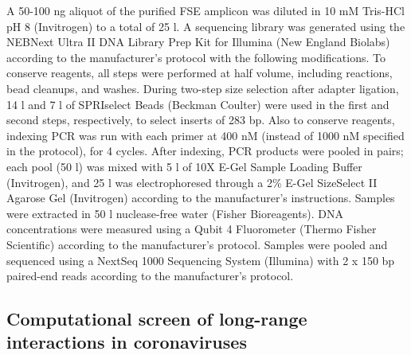 \documentclass[main.tex]{subfiles}
\begin{document}
A 50-100 ng aliquot of the purified FSE amplicon was diluted in 10 mM Tris-HCl pH 8 (Invitrogen) to a total of 25 \textmu l.
A sequencing library was generated using the NEBNext Ultra II DNA Library Prep Kit for Illumina (New England Biolabs) according to the manufacturer's protocol with the following modifications.
To conserve reagents, all steps were performed at half volume, including reactions, bead cleanups, and washes.
During two-step size selection after adapter ligation, 14 \textmu l and 7 \textmu l of SPRIselect Beads (Beckman Coulter) were used in the first and second steps, respectively, to select inserts of 283 bp.
Also to conserve reagents, indexing PCR was run with each primer at 400 nM (instead of 1000 nM specified in the protocol), for 4 cycles.
After indexing, PCR products were pooled in pairs; each pool (50 \textmu l) was mixed with 5 \textmu l of 10X E-Gel Sample Loading Buffer (Invitrogen), and 25 \textmu l was electrophoresed through a 2\% E-Gel SizeSelect II Agarose Gel (Invitrogen) according to the manufacturer's instructions.
Samples were extracted in 50 \textmu l nuclease-free water (Fisher Bioreagents).
DNA concentrations were measured using a Qubit 4 Fluorometer (Thermo Fisher Scientific) according to the manufacturer's protocol.
Samples were pooled and sequenced using a NextSeq 1000 Sequencing System (Illumina) with 2 x 150 bp paired-end reads according to the manufacturer's protocol.


\subsection{Computational screen of long-range interactions in coronaviruses}
\label{screen_lri_comp}
\end{document}
